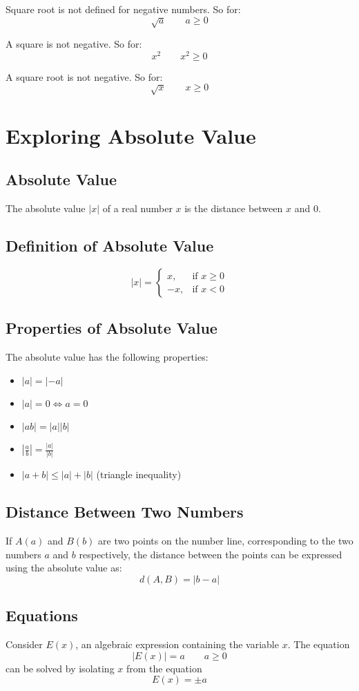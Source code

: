 			Square root is not defined for negative numbers. So for:
			\[\sqrt{a} \qquad a \geq 0\]

			A square is not negative. So for:
			\[x^2 \qquad x^2 \geq 0\]

			A square root is not negative. So for:
			\[\sqrt{x} \qquad x \geq 0\]
	\section{Exploring Absolute Value}
		\label{sec:abs}
		\subsection{Absolute Value}
			The absolute value $|x|$ of a real number $x$ is the distance between $x$ and 0.
		\subsection{Definition of Absolute Value}
			\begin{equation*}
				|x| = 
				\begin{cases}
					x, & \text{if } x \geq 0\\
					-x, & \text{if } x < 0
				\end{cases}
			\end{equation*}
		\subsection{Properties of Absolute Value}
			The absolute value has the following properties:
			\begin{itemize}
				\item $|a| = |-a|$
				\item $|a| = 0 \iff a = 0$
				\item $|ab| = |a||b|$
				\item $|\frac{a}{b}| = \frac{|a|}{|b|}$
				\item $|a + b| \leq |a| + |b|$ (triangle inequality)
			\end{itemize}
		\subsection{Distance Between Two Numbers}
			If $A(a)$ and $B(b)$ are two points on the number line, corresponding to the two numbers $a$ and $b$ respectively, the distance between the points can be expressed using the absolute value as:
			\[d(A, B) = |b - a|\]
		\subsection{Equations}
			Consider $E(x)$, an algebraic expression containing the variable $x$. The equation
			\[|E(x)| = a \qquad a \geq 0\]
			can be solved by isolating $x$ from the equation
			\[E(x) = \pm a\]

